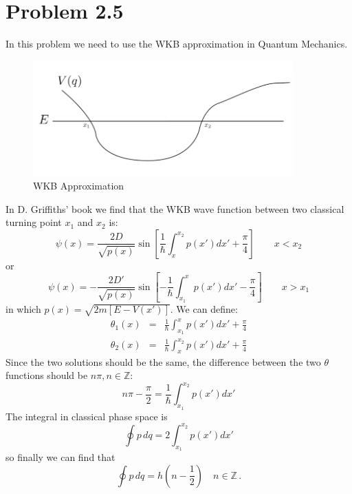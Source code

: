 \documentclass{article}
\begin{document}
\section*{Problem 2.5}
In this problem we need to use the WKB approximation in Quantum Mechanics. 
\begin{figure}[!htp]
\centering
\includegraphics[width=10cm]{./figures/2.3-2.5/pic1.png}
\caption{WKB Approximation}
\end{figure}
In D. Griffiths' book we find that the WKB wave function between two classical turning point $x_1$ and $x_2$ is:
$$
\psi(x) = \frac{2D}{\sqrt{p(x)}}\sin\left[\frac{1}{\hbar}\int_x^{x_2}p(x')dx' + \frac{\pi}{4}\right]\quad\quad x< x_2
$$
or
$$
\psi(x) = -\frac{2D'}{\sqrt{p(x)}}\sin\left[-\frac{1}{\hbar}\int_{x_1}^{x}p(x')dx'-\frac{\pi}{4}\right]\quad\quad x>x_1
$$
in which $p(x) = \sqrt{2m[E-V(x')]}$. We can define:
\begin{eqnarray*}
\theta_1(x) &=& \frac{1}{\hbar}\int_{x_1}^{x}p(x')dx'+\frac{\pi}{4}\\
\theta_2(x) &=& \frac{1}{\hbar}\int_x^{x_2}p(x')dx' + \frac{\pi}{4}
\end{eqnarray*}
Since the two solutions should be the same, the difference between the two $\theta$ functions should be $n\pi, n\in\mathbb{Z}$: 
\begin{equation}
n\pi-\frac{\pi}{2} = \frac{1}{\hbar}\int_{x_1}^{x_2}p(x')dx'
\end{equation}
The integral in classical phase space is
$$
\oint p\,dq = 2 \int_{x_1}^{x_2}p(x')dx'
$$
so finally we can find that 
\begin{equation}
\oint p\,dq = h\left(n-\frac{1}{2}\right)\quad n\in\mathbb{Z}\,.
\end{equation}
\end{document}
